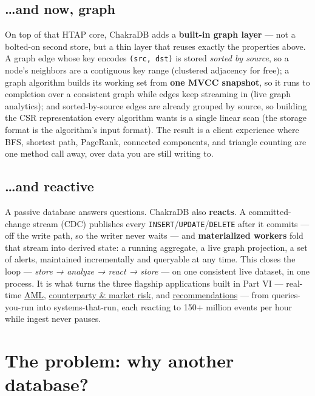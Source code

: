 \documentclass[
  11pt,
  openany]{book}
\begin{document}
\subsection{\ldots and now, graph}\label{and-now-graph}

On top of that HTAP core, ChakraDB adds a \textbf{built-in graph layer}
--- not a bolted-on second store, but a thin layer that reuses exactly
the properties above. A graph edge whose key encodes
\texttt{(src,\ dst)} is stored \emph{sorted by source}, so a node's
neighbors are a contiguous key range (clustered adjacency for free); a
graph algorithm builds its working set from \textbf{one MVCC snapshot},
so it runs to completion over a consistent graph while edges keep
streaming in (live graph analytics); and sorted-by-source edges are
already grouped by source, so building the CSR representation every
algorithm wants is a single linear scan (the storage format is the
algorithm's input format). The result is a client experience where BFS,
shortest path, PageRank, connected components, and triangle counting are
one method call away, over data you are still writing to.

\subsection{\ldots and reactive}\label{and-reactive}

A passive database answers questions. ChakraDB also \textbf{reacts}. A
committed-change stream (CDC) publishes every
\texttt{INSERT}/\texttt{UPDATE}/\texttt{DELETE} after it commits --- off
the write path, so the writer never waits --- and \textbf{materialized
workers} fold that stream into derived state: a running aggregate, a
live graph projection, a set of alerts, maintained incrementally and
queryable at any time. This closes the loop --- \emph{store → analyze →
react → store} --- on one consistent live dataset, in one process. It is
what turns the three flagship applications built in Part VI ---
real-time \href{../case-studies/aml.md}{AML},
\href{../case-studies/ccr.md}{counterparty \& market risk}, and
\href{../case-studies/reco.md}{recommendations} --- from queries-you-run
into systems-that-run, each reacting to 150+ million events per hour
while ingest never pauses.

\section{The problem: why another
database?}\label{the-problem-why-another-database}
\end{document}
